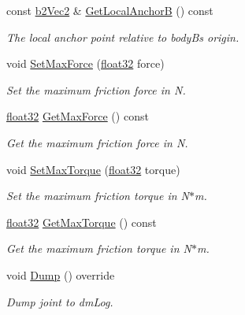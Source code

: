 \begin{DoxyCompactItemize}
const \mbox{\hyperlink{structb2_vec2}{b2\+Vec2}} \& \mbox{\hyperlink{classb2_friction_joint_a44fab4532f7c4aad9d833f009caac586}{Get\+Local\+AnchorB}} () const
\begin{DoxyCompactList}\small\item\em The local anchor point relative to bodyB\textquotesingle{}s origin. \end{DoxyCompactList}\item 
void \mbox{\hyperlink{classb2_friction_joint_a7936d852b5ad71dc92efc397865dda41}{Set\+Max\+Force}} (\mbox{\hyperlink{b2_settings_8h_aacdc525d6f7bddb3ae95d5c311bd06a1}{float32}} force)
\begin{DoxyCompactList}\small\item\em Set the maximum friction force in N. \end{DoxyCompactList}\item 
\mbox{\hyperlink{b2_settings_8h_aacdc525d6f7bddb3ae95d5c311bd06a1}{float32}} \mbox{\hyperlink{classb2_friction_joint_ad5f66e02841b8402e5560476c3c478c9}{Get\+Max\+Force}} () const
\begin{DoxyCompactList}\small\item\em Get the maximum friction force in N. \end{DoxyCompactList}\item 
void \mbox{\hyperlink{classb2_friction_joint_a9e3aaf485dc86a378bb62ee78cea43aa}{Set\+Max\+Torque}} (\mbox{\hyperlink{b2_settings_8h_aacdc525d6f7bddb3ae95d5c311bd06a1}{float32}} torque)
\begin{DoxyCompactList}\small\item\em Set the maximum friction torque in N$\ast$m. \end{DoxyCompactList}\item 
\mbox{\hyperlink{b2_settings_8h_aacdc525d6f7bddb3ae95d5c311bd06a1}{float32}} \mbox{\hyperlink{classb2_friction_joint_ae926972faa5846436cbcfe5772adc1f6}{Get\+Max\+Torque}} () const
\begin{DoxyCompactList}\small\item\em Get the maximum friction torque in N$\ast$m. \end{DoxyCompactList}\item 
void \mbox{\hyperlink{classb2_friction_joint_a934a3ce5bda09bc07111c1dd4e192406}{Dump}} () override
\begin{DoxyCompactList}\small\item\em Dump joint to dm\+Log. \end{DoxyCompactList}\end{DoxyCompactItemize}
